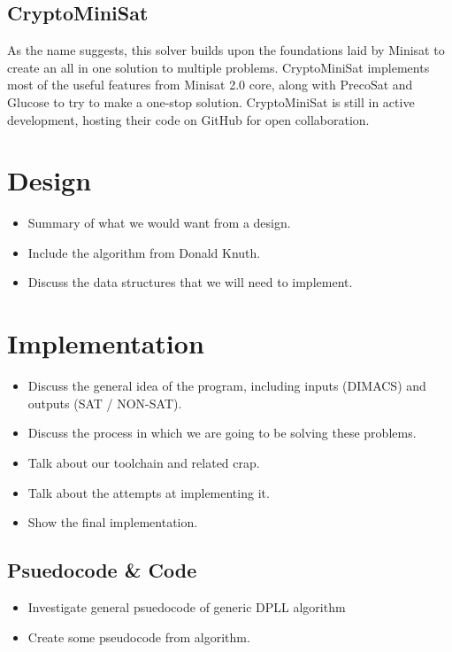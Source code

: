 \documentclass{article}
\begin{document}
\subsection{CryptoMiniSat}
As the name suggests, this solver builds upon the foundations laid by Minisat to create an all in
one solution to multiple problems. CryptoMiniSat implements most of the useful features from Minisat
2.0 core, along with PrecoSat and Glucose to try to make a one-stop solution. CryptoMiniSat is still
in active development, hosting their code on GitHub for open collaboration.

\section{Design}
\begin{itemize}
    \item Summary of what we would want from a design.
    \item Include the algorithm from Donald Knuth.
    \item Discuss the data structures that we will need to implement.
\end{itemize}

\section{Implementation}
\begin{itemize}
    \item Discuss the general idea of the program, including inputs (DIMACS) and outputs (SAT / NON-SAT).
    \item Discuss the process in which we are going to be solving these problems.
    \item Talk about our toolchain and related crap.
    \item Talk about the attempts at implementing it.
    \item Show the final implementation.
\end{itemize}

\subsection{Psuedocode \& Code}
\begin{itemize}
    \item Investigate general psuedocode of generic DPLL algorithm
    \item Create some pseudocode from algorithm.
\end{itemize}
\end{document}
